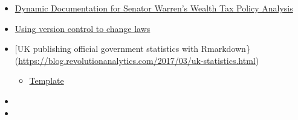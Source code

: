 \documentclass[]{book}
\providecommand{\tightlist}{%
  \setlength{\itemsep}{0pt}\setlength{\parskip}{0pt}}
\begin{document}
\begin{itemize}
\item
  \href{http://wealthtaxsimulator.org/analysis/}{Dynamic Documentation for Senator Warren's Wealth Tax Policy Analysis}
\item
  \href{https://arstechnica.com/tech-policy/2018/11/how-i-changed-the-law-with-a-github-pull-request/}{Using version control to change laws}
\item
  {[}UK publishing official government statistics with Rmarkdown\}(\url{https://blog.revolutionanalytics.com/2017/03/uk-statistics.html})

  \begin{itemize}
  \tightlist
  \item
    \href{https://ukgovdatascience.github.io/govdown/}{Template}
  \end{itemize}
\item
\item
\end{itemize}


\end{document}
